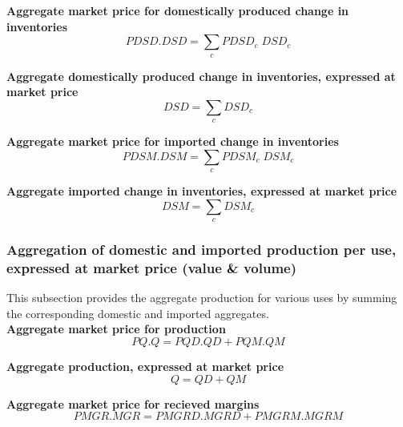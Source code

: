 \documentclass[12pt]{article}
\numberwithin{equation}{section}
\begin{document}
\noindent\textbf{Aggregate market price for domestically produced change in inventories} \\
\begin{dmath}
PDSD . DSD = \sum_{c} PDSD_{c} \; DSD_{c}
\end{dmath}

\noindent\textbf{Aggregate domestically produced change in inventories, expressed at market price} \\
\begin{dmath}
DSD = \sum_{c} DSD_{c}
\end{dmath}

\noindent\textbf{Aggregate market price for imported change in inventories} \\
\begin{dmath}
PDSM . DSM = \sum_{c} PDSM_{c} \; DSM_{c}
\end{dmath}

\noindent\textbf{Aggregate imported change in inventories, expressed at market price} \\
\begin{dmath}
DSM = \sum_{c} DSM_{c}
\end{dmath}




\subsubsection{Aggregation of domestic and imported production per use, expressed at market price (value \& volume)}



This subsection provides the aggregate production for various uses by summing the corresponding domestic and imported aggregates. \\

\noindent\textbf{Aggregate market price for production} \\
\begin{dmath}
PQ . Q = PQD . QD + PQM . QM
\end{dmath}

\noindent\textbf{Aggregate production, expressed at market price} \\
\begin{dmath}
Q = QD + QM
\end{dmath}

\noindent\textbf{Aggregate market price for recieved margins} \\
\begin{dmath}
PMGR . MGR = PMGRD . MGRD + PMGRM . MGRM
\end{dmath}
\end{document}
